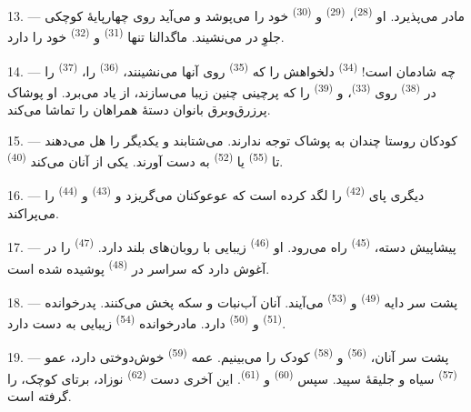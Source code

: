 13. --- مادر می‌پذیرد. او  \textsuperscript{(28)}،
 \textsuperscript{(29)} و 
\textsuperscript{(30)} خود را می‌پوشد و می‌آید روی چهارپایهٔ کوچکی جلوِ
در می‌نشیند. ماگدالنا تنها  \textsuperscript{(31)} و
 \textsuperscript{(32)} خود را دارد.

14. --- چه شادمان است!  \textsuperscript{(34)}
دلخواهش را که  \textsuperscript{(35)} روی آنها
می‌نشینند،  \textsuperscript{(36)} را،
 \textsuperscript{(37)} را در 
\textsuperscript{(38)} روی  \textsuperscript{(33)}، و
 \textsuperscript{(39)} را که پرچینی چنین زیبا
می‌سازند، از یاد می‌برد. او پوشاک پرزرق‌وبرق بانوان دستهٔ همراهان را
تماشا می‌کند.

15. --- کودکان روستا چندان به پوشاک توجه ندارند. می‌شتابند و یکدیگر را
هل می‌دهند تا  \textsuperscript{(55)} یا 
\textsuperscript{(52)} به دست آورند. یکی از آنان 
می‌کند \textsuperscript{(40)}.

16. --- دیگری پای  \textsuperscript{(42)} را لگد کرده است که
عوعوکنان می‌گریزد و  \textsuperscript{(43)} و
 \textsuperscript{(44)} را می‌پراکند.

\VUsaut{5.0mm}
\VUsaut{4.0mm}

17. --- پیشاپیش دسته،  \textsuperscript{(45)} راه می‌رود.
او  \textsuperscript{(46)} زیبایی با روبان‌های بلند
دارد.  \textsuperscript{(47)} را در آغوش دارد که سراسر در
 \textsuperscript{(48)} پوشیده شده است.

18. --- پشت سر دایه  \textsuperscript{(49)} و
 \textsuperscript{(53)} می‌آیند. آنان آب‌نبات و سکه
پخش می‌کنند. پدرخوانده  \textsuperscript{(51)} و
 \textsuperscript{(50)} دارد. مادرخوانده
 \textsuperscript{(54)} زیبایی به دست دارد.

19. --- پشت سر آنان،  \textsuperscript{(56)} و
 \textsuperscript{(58)} کودک را می‌بینیم. عمه
 \textsuperscript{(59)} خوش‌دوختی دارد، عمو
 \textsuperscript{(57)} سیاه و جلیقهٔ سپید. سپس
 \textsuperscript{(60)} و 
\textsuperscript{(61)}. این آخری دست  \textsuperscript{(62)}
نوزاد، برتای کوچک، را گرفته است.

